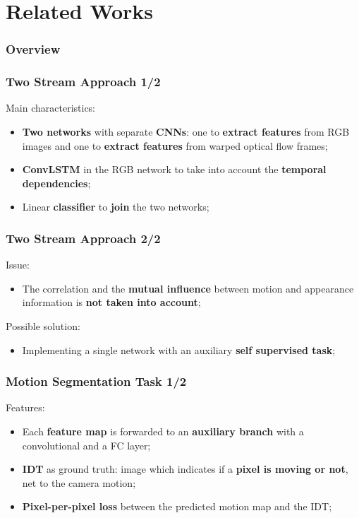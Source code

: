 \documentclass{beamer}
\begin{document}
\section{Related Works}

\begin{frame}
\frametitle{Overview} 
  \tableofcontents[currentsection]
\end{frame}

\begin{frame}
\frametitle{Two Stream Approach 1/2}
Main characteristics:
\begin{itemize}
\item \textbf{Two networks} with separate \textbf{CNNs}: one to \textbf{extract features} from RGB images and one to \textbf{extract features} from warped optical flow frames;
\item \textbf{ConvLSTM} in the RGB network to take into account the \textbf{temporal dependencies};
\item Linear \textbf{classifier} to \textbf{join} the two networks;
\end{itemize}
\end{frame}

\begin{frame}
\frametitle{Two Stream Approach 2/2}
Issue:
\begin{itemize}
\item The correlation and the \textbf{mutual influence} between motion and appearance information is \textbf{not taken into account};
\end{itemize}
Possible solution:
\begin{itemize}
\item Implementing a single network with an auxiliary \textbf{self supervised task};
\end{itemize}
\end{frame}

\begin{frame}
\frametitle{Motion Segmentation Task 1/2}

Features:
\begin{itemize}
\item Each \textbf{feature map} is forwarded to an \textbf{auxiliary branch} with a convolutional and a FC layer;
\item \textbf{IDT} as ground truth: image which indicates if a \textbf{pixel is moving or not}, net to the camera motion;
\item \textbf{Pixel-per-pixel loss} between the predicted motion map and the IDT;
\end{itemize}

\end{frame}
\end{document}
